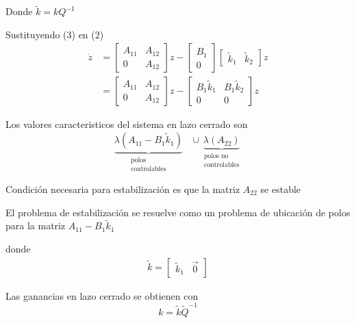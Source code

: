 Donde \( \tilde{k} = kQ^{-1} \)

Sustituyendo (3)  en (2)
\[
    \begin{split}
        \dot{z} & = 
        \begin{bmatrix}
            A_{11} & A_{12} \\
            0 & A_{12}
        \end{bmatrix} z
        -
        \begin{bmatrix}
            B_{1} \\ 0
        \end{bmatrix}
        \begin{bmatrix}
            \tilde{k}_{1} & \tilde{k}_{2}
        \end{bmatrix} z \\
        & = 
        \begin{bmatrix}
            A_{11} & A_{12} \\
            0 & A_{12}
        \end{bmatrix} z
        -
        \begin{bmatrix}
            B_{1} \tilde{k}_{1} & B_{1} \tilde{k}_{2} \\
            0 & 0
        \end{bmatrix} z
    \end{split}
\]

Los valores caracteristicos del sistema en lazo cerrado son 
\[
    \underbrace{\lambda(A_{11} - B_{1}\tilde{k}_{1})}_{
        \begin{matrix}
            \text{polos} \\
            \text{controlables}
        \end{matrix}
    } \;\;\;\cup
    \underbrace{\lambda(A_{22})}_{
        \begin{matrix}
            \text{polos no} \\
            \text{controlables}
        \end{matrix}
    }
\]

Condición necesaria para estabilización es que la matriz \( A_{22} \) se estable

El problema de estabilización se resuelve como un problema de ubicación de polos para la matriz \( A_{11}-B_{1}\tilde{k}_{1} \)

donde 
\[
    \begin{split}
        \tilde{k} = 
        \begin{bmatrix}
            \tilde{k}_{1} & \Vec{0}
        \end{bmatrix}
    \end{split}
\]

Las ganancias en lazo cerrado se obtienen con
\[
    k = \tilde{k} \tilde{Q}^{-1}
\]